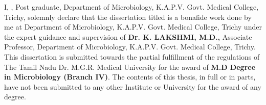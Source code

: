 \declaration

\vspace*{0.5in}

\noindent I, \textbf{\MyAuthor}, Post graduate, Department of Microbiology, K.A.P.V. Govt. Medical College, Trichy, solemnly declare that the dissertation titled \textbf {\MyTitle} is a bonafide work done by me at Department of Microbiology, K.A.P.V. Govt. Medical College, Trichy under the expert guidance and supervision of \textbf {Dr. K. LAKSHMI, M.D.,} Associate Professor, Department of Microbiology, K.A.P.V. Govt. Medical College, Trichy. This dissertation is submitted towards the partial fulfillment of the regulations of The Tamil Nadu Dr. M.G.R. Medical University for the award of \textbf {M.D Degree in Microbiology (Branch IV)}. The contents of this thesis, in full or in parts, have not been submitted to any other Institute or University for the award of any degree.


\vspace*{1.0in}

